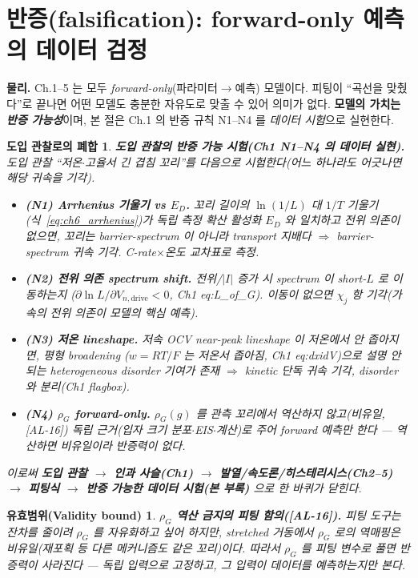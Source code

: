 \documentclass[11pt,a4paper]{article}
\newtheorem*{boundbox}{유효범위(Validity bound)}
\newtheorem*{loopbox}{도입 관찰로의 폐합}
\newcommand{\drive}{\mathrm{drive}}
\newcommand{\AL}[1]{\textsf{[AL-#1]}}
\begin{document}
\section{반증(falsification): forward-only 예측의 데이터 검정}\label{sec:ch6_falsify}
\textbf{물리.} Ch.1--5 는 모두 \emph{forward-only}(파라미터$\to$예측) 모델이다. 피팅이 ``곡선을 맞췄다''로 끝나면
어떤 모델도 충분한 자유도로 맞출 수 있어 의미가 없다. \textbf{모델의 가치는 \emph{반증 가능성}}이며, 본 절은 Ch.1
의 반증 규칙 N1--N4 를 \emph{데이터 시험}으로 실현한다.
\begin{loopbox}
\textbf{도입 관찰의 반증 가능 시험(Ch1 N1--N4 의 데이터 실현).} 도입 관찰 ``저온$\cdot$고율서 긴 겹침 꼬리''를
다음으로 시험한다(어느 하나라도 어긋나면 해당 귀속을 \emph{기각}).
\begin{itemize}[leftmargin=1.6em]
\item \textbf{(N1) Arrhenius 기울기 vs $E_D$.} 꼬리 길이의 $\ln(1/L)$ 대 $1/T$ 기울기(식~\eqref{eq:ch6_arrhenius})가
  독립 측정 확산 활성화 $E_D$ 와 \emph{일치}하고 \emph{전위 의존이 없으면}, 꼬리는 barrier-spectrum 이 아니라
  transport 지배다 $\Rightarrow$ barrier-spectrum 귀속 \emph{기각}. C-rate$\times$온도 교차표로 측정.
\item \textbf{(N2) 전위 의존 spectrum shift.} 전위/$|I|$ 증가 시 spectrum 이 short-$L$ 로 이동하는지
  ($\partial\ln L/\partial V_{n,\drive}<0$, Ch1 eq:L\_of\_G). 이동이 없으면 $\chi_j$ 항 \emph{기각}(가속의 전위
  의존이 모델의 핵심 예측).
\item \textbf{(N3) 저온 lineshape.} 저속 OCV near-peak lineshape 이 저온에서 \emph{안 좁아지면}, 평형 broadening
  ($w=RT/F$ 는 저온서 좁아짐, Ch1 eq:dxidV)으로 설명 안 되는 heterogeneous disorder 기여가 존재 $\Rightarrow$
  kinetic 단독 귀속 기각, disorder 와 분리(Ch1 flagbox).
\item \textbf{(N4) $\rho_G$ forward-only.} $\rho_G(g)$ 를 관측 꼬리에서 \emph{역산하지 않고}(비유일, \AL{16})
  독립 근거(입자 크기 분포$\cdot$EIS$\cdot$계산)로 주어 forward 예측만 한다 — 역산하면 비유일이라 반증력이 없다.
\end{itemize}
이로써 \textbf{도입 관찰 $\to$ 인과 사슬(Ch1) $\to$ 발열/속도론/히스테리시스(Ch2--5) $\to$ 피팅식 $\to$ 반증
가능한 데이터 시험(본 부록)} 으로 한 바퀴가 닫힌다.
\end{loopbox}
\begin{boundbox}
\textbf{$\rho_G$ 역산 금지의 피팅 함의(\AL{16}).} 피팅 도구는 잔차를 줄이려 $\rho_G$ 를 자유화하고 싶어 하지만,
stretched 거동에서 $\rho_G$ 로의 역매핑은 비유일(재포획 등 다른 메커니즘도 같은 꼬리)이다. 따라서 $\rho_G$ 를
피팅 변수로 풀면 반증력이 사라진다 — 독립 입력으로 고정하고, 그 입력이 데이터를 \emph{예측}하는지만 본다.
\end{boundbox}
\end{document}
